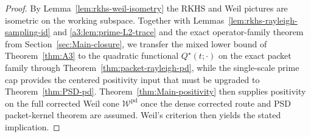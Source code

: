 \begin{proof}
By Lemma~\ref{lem:rkhs-weil-isometry} the RKHS and Weil pictures are isometric on
the working subspace. Together with Lemmas~\ref{lem:rkhs-rayleigh-sampling-id} and
\ref{a3:lem:prime-L2-trace} and the exact operator-family theorem from
Section~\ref{sec:Main-closure}, we transfer the mixed lower bound of
Theorem~\ref{thm:A3} to the quadratic functional $Q^\star(t;\cdot)$ on the exact
packet family through Theorem~\ref{thm:packet-rayleigh-pd}, while the single-scale
prime cap provides the centered positivity input that must be upgraded to
Theorem~\ref{thm:PSD-pd}. Theorem~\ref{thm:Main-positivity} then supplies positivity on
the full corrected Weil cone $\mathcal W^{\mathrm{pd}}$ once the dense corrected route
and PSD packet-kernel theorem are assumed. Weil's criterion then yields the
stated implication.
\end{proof}
